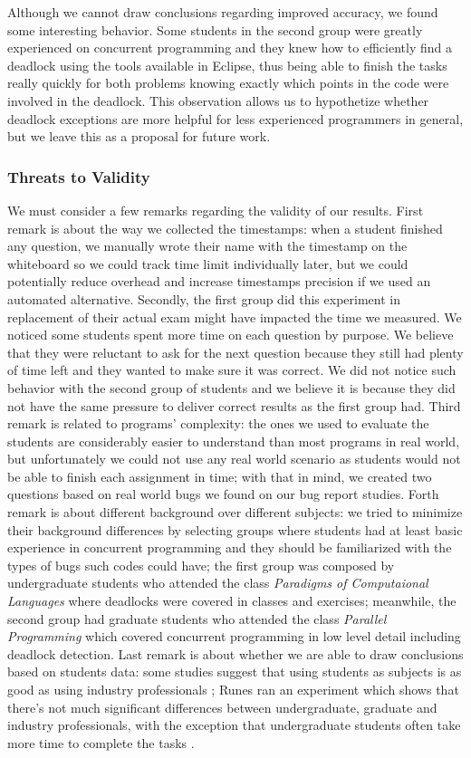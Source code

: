 Although we cannot draw conclusions regarding improved accuracy, we found some interesting behavior. Some students in the second group were greatly experienced on concurrent programming and they knew how to efficiently find a deadlock using the tools available in Eclipse, thus being able to finish the tasks really quickly for both problems knowing exactly which points in the code were involved in the deadlock. This observation allows us to hypothetize whether deadlock exceptions are more helpful for less experienced programmers in general, but we leave this as a proposal for future work.

\subsubsection{Threats to Validity}

We must consider a few remarks regarding the validity of our results. First remark is about the way we collected the timestamps: when a student finished any question, we manually wrote their name with the timestamp on the whiteboard so we could track time limit individually later, but we could potentially reduce overhead and increase timestamps precision if we used an automated alternative.
Secondly, the first group did this experiment in replacement of their actual exam might have impacted the time we measured. We noticed some students spent more time on each question by purpose. We believe that they were reluctant to ask for the next question because they still had plenty of time left and they wanted to make sure it was correct. We did not notice such behavior with the second group of students and we believe it is because they did not have the same pressure to deliver correct results as the first group had.
Third remark is related to programs' complexity: the ones we used to evaluate the students are considerably easier to understand than most programs in real world, but unfortunately we could not use any real world scenario as students would not be able to finish each assignment in time; with that in mind, we created two questions based on real world bugs we found on our bug report studies.
Forth remark is about different background over different subjects: we tried to minimize their background differences by selecting groups where students had at least basic experience in concurrent programming and they should be familiarized with the types of bugs such codes could have; the first group was composed by undergraduate students who attended the class \emph{Paradigms of Computaional Languages} where deadlocks were covered in classes and exercises; meanwhile, the second group had graduate students who attended the class \emph{Parallel Programming} which covered concurrent programming in low level detail including deadlock detection. Last remark is about whether we are able to draw conclusions based on students data: some studies suggest that using students as subjects is as good as using industry professionals \cite{staron}; Runes ran an experiment which shows that there's not much significant differences between undergraduate, graduate and industry professionals, with the exception that undergraduate students often take more time to complete the tasks \cite{runes}.


